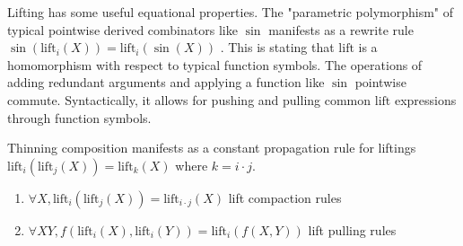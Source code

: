 \documentclass{article}%
\newcommand{\lift}{\text{lift}}
\begin{document}
Lifting has some useful equational properties. The "parametric polymorphism" of typical pointwise derived combinators like $\sin$ manifests as a rewrite rule $\sin(\lift_i(X)) = \lift_i(\sin(X))$ . This is stating that $\lift$ is a homomorphism with respect to typical function symbols. The operations of adding redundant arguments and applying a function like $\sin$ pointwise commute. Syntactically, it allows for pushing and pulling common $\lift$ expressions through function symbols.


Thinning composition manifests as a constant propagation rule for liftings $\lift_i(\lift_j(X)) = \lift_k(X)$ where $k = i \cdot j$.

\begin{enumerate}
\item $\forall X, \lift_i(\lift_j(X)) = \lift_{i \cdot j}(X)$ lift compaction rules
\item $\forall X Y, f(\lift_i(X), \lift_i(Y)) = \lift_i(f(X,Y))$ lift pulling rules
\end{enumerate}








\end{document}
